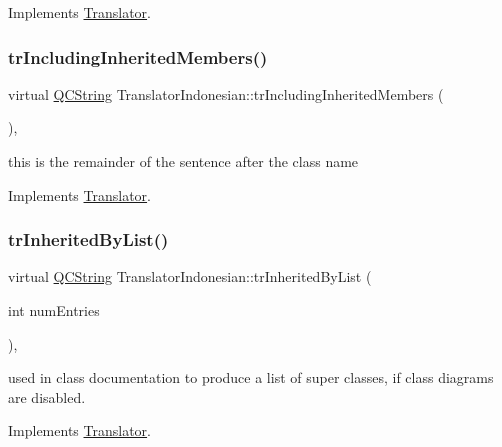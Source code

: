 Implements \mbox{\hyperlink{class_translator}{Translator}}.

\mbox{\label{class_translator_indonesian_a729394e462f7ea307a51e46df5ad4e4e}} 
\subsubsection{\texorpdfstring{trIncludingInheritedMembers()}{trIncludingInheritedMembers()}}
{\footnotesize\ttfamily virtual \mbox{\hyperlink{class_q_c_string}{Q\+C\+String}} Translator\+Indonesian\+::tr\+Including\+Inherited\+Members (\begin{DoxyParamCaption}{ }\end{DoxyParamCaption})\hspace{0.3cm}{\ttfamily [inline]}, {\ttfamily [virtual]}}

this is the remainder of the sentence after the class name 

Implements \mbox{\hyperlink{class_translator}{Translator}}.

\mbox{\label{class_translator_indonesian_ad03f6d99d03ef54e9eb0a72949fcea8f}} 
\subsubsection{\texorpdfstring{trInheritedByList()}{trInheritedByList()}}
{\footnotesize\ttfamily virtual \mbox{\hyperlink{class_q_c_string}{Q\+C\+String}} Translator\+Indonesian\+::tr\+Inherited\+By\+List (\begin{DoxyParamCaption}\item[{int}]{num\+Entries }\end{DoxyParamCaption})\hspace{0.3cm}{\ttfamily [inline]}, {\ttfamily [virtual]}}

used in class documentation to produce a list of super classes, if class diagrams are disabled. 

Implements \mbox{\hyperlink{class_translator}{Translator}}.

